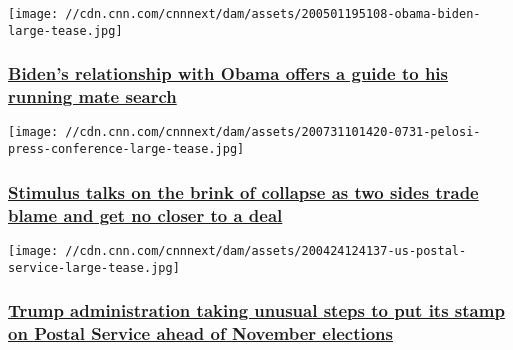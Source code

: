 \href{/2020/08/07/politics/biden-running-mate/index.html}{}

\texttt{[image: //cdn.cnn.com/cnnnext/dam/assets/200501195108-obama-biden-large-tease.jpg]}

\hypertarget{bidens-relationship-with-obama-offers-a-guide-to-his-running-mate-search}{%
\subsubsection{\texorpdfstring{\href{/2020/08/07/politics/biden-running-mate/index.html}{Biden's
relationship with Obama offers a guide to his running mate
search}}{Biden's relationship with Obama offers a guide to his running mate search}}\label{bidens-relationship-with-obama-offers-a-guide-to-his-running-mate-search}}

\href{/2020/08/06/politics/stimulus-talks-latest-nancy-pelosi-jobless-benefits/index.html}{}

\texttt{[image: //cdn.cnn.com/cnnnext/dam/assets/200731101420-0731-pelosi-press-conference-large-tease.jpg]}

\hypertarget{stimulus-talks-on-the-brink-of-collapse-as-two-sides-trade-blame-and-get-no-closer-to-a-deal}{%
\subsubsection{\texorpdfstring{\href{/2020/08/06/politics/stimulus-talks-latest-nancy-pelosi-jobless-benefits/index.html}{Stimulus
talks on the brink of collapse as two sides trade blame and get no
closer to a
deal}}{Stimulus talks on the brink of collapse as two sides trade blame and get no closer to a deal}}\label{stimulus-talks-on-the-brink-of-collapse-as-two-sides-trade-blame-and-get-no-closer-to-a-deal}}

\href{/2020/08/06/politics/trump-administration-postal-service-elections/index.html}{}

\texttt{[image: //cdn.cnn.com/cnnnext/dam/assets/200424124137-us-postal-service-large-tease.jpg]}

\hypertarget{trump-administration-taking-unusual-steps-to-put-its-stamp-on-postal-service-ahead-of-november-elections}{%
\subsubsection{\texorpdfstring{\href{/2020/08/06/politics/trump-administration-postal-service-elections/index.html}{Trump
administration taking unusual steps to put its stamp on Postal Service
ahead of November
elections}}{Trump administration taking unusual steps to put its stamp on Postal Service ahead of November elections}}\label{trump-administration-taking-unusual-steps-to-put-its-stamp-on-postal-service-ahead-of-november-elections}}

